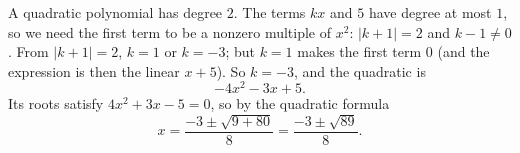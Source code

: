 A quadratic polynomial has degree $2$. The terms $kx$ and $5$ have degree at most $1$, so we need the first term to be a nonzero multiple of $x^2$: $|k+1|=2$ and $k-1\ne0$. From $|k+1|=2$, $k=1$ or $k=-3$; but $k=1$ makes the first term $0$ (and the expression is then the linear $x+5$). So $k=\boxed{-3}$, and the quadratic is
\[-4x^2-3x+5.\]
Its roots satisfy $4x^2+3x-5=0$, so by the quadratic formula
\[x=\dfrac{-3\pm\sqrt{9+80}}{8}=\boxed{\dfrac{-3\pm\sqrt{89}}{8}}.\]
